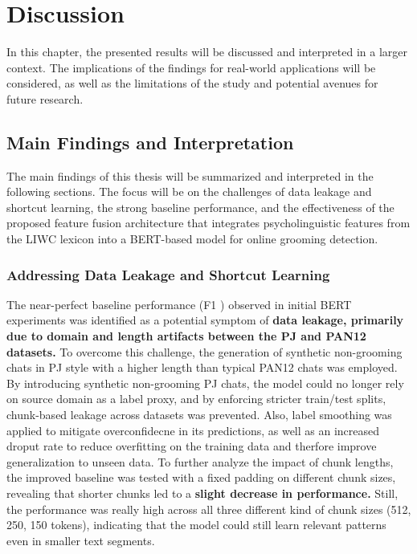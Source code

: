 \chapter{Discussion}
In this chapter, the presented results will be discussed and interpreted in a larger context. The implications of the findings for real-world applications will be considered, as well as the limitations of the study and potential avenues for future research.


\section{Main Findings and Interpretation}

The main findings of this thesis will be summarized and interpreted in the following sections. The focus will be on the challenges of data leakage and shortcut learning, the strong baseline performance, and the effectiveness of the proposed feature fusion architecture that integrates psycholinguistic features from the LIWC lexicon into a BERT-based model for online grooming detection. 



\subsection{Addressing Data Leakage and Shortcut Learning}

The near-perfect baseline performance (F1 ) observed in initial BERT experiments was identified as a potential symptom of \textbf{data leakage, primarily due to domain and length artifacts between the PJ and PAN12 datasets.} To overcome this challenge, the generation of synthetic non-grooming chats in PJ style with a higher length than typical PAN12 chats was employed. By introducing synthetic non-grooming PJ chats, the model could no longer rely on source domain as a label proxy, and by enforcing stricter train/test splits, chunk-based leakage across datasets was prevented. Also, label smoothing was applied to mitigate overconfidecne in its predictions, as well as an increased droput rate to reduce overfitting on the training data and therfore improve generalization to unseen data. To further analyze the impact of chunk lengths, the improved baseline was tested with a fixed padding on different chunk sizes, revealing that shorter chunks led to a \textbf{slight decrease in performance.} Still, the performance was really high across all three different kind of chunk sizes (512, 250, 150 tokens), indicating that the model could still learn relevant patterns even in smaller text segments. 


